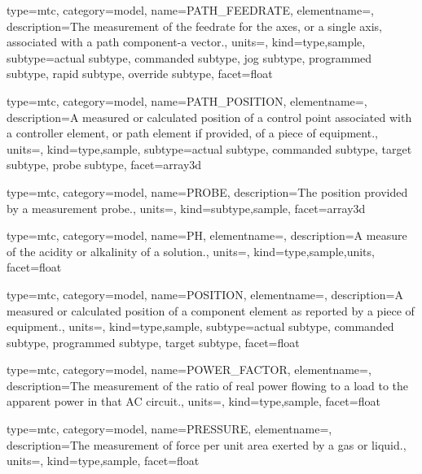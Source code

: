 {
  type=mtc,
  category=model,
  name={PATH\_FEEDRATE},
  elementname=,
  description={The measurement of the feedrate for the axes, or a single axis, associated with a \gls{path} component-a vector.},
  units=,
  kind={type,sample},
  subtype={\gls{actual subtype}, \gls{commanded subtype}, \gls{jog subtype}, \gls{programmed subtype}, \gls{rapid subtype}, \gls{override subtype}},
  facet={\gls{float}}
}





{
  type=mtc,
  category=model,
  name={PATH\_POSITION},
  elementname=,
  description={A measured or calculated position of a control point associated with a \gls{controller} element, or \gls{path} element if provided, of a piece of equipment.},
  units=,
  kind={type,sample},
  subtype={\gls{actual subtype}, \gls{commanded subtype}, \gls{target subtype}, \gls{probe subtype}},
  facet={\gls{array3d}}
}


{
  type=mtc,
  category=model,
  name={PROBE},
  description={The position provided by a measurement probe.},
  units=,
  kind={subtype,sample},
  facet={\gls{array3d}}
}


{
  type=mtc,
  category=model,
  name={PH},
  elementname=,
  description={A measure of the acidity or alkalinity of a solution.},
  units=,
  kind={type,sample,units},
  facet={\gls{float}}
}


{
  type=mtc,
  category=model,
  name={POSITION},
  elementname=,
  description={A measured or calculated position of a \gls{component} element as reported by a piece of equipment.},
  units=,
  kind={type,sample},
  subtype={\gls{actual subtype}, \gls{commanded subtype}, \gls{programmed subtype}, \gls{target subtype}},
  facet={\gls{float}}
}


{
  type=mtc,
  category=model,
  name={POWER\_FACTOR},
  elementname=,
  description={The measurement of the ratio of real power flowing to a load to the apparent power in that AC circuit.},
  units=,
  kind={type,sample},
  facet={\gls{float}}
}


{
  type=mtc,
  category=model,
  name={PRESSURE},
  elementname=,
  description={The measurement of force per unit area exerted by a gas or liquid.},
  units=,
  kind={type,sample},
  facet={\gls{float}}
}


